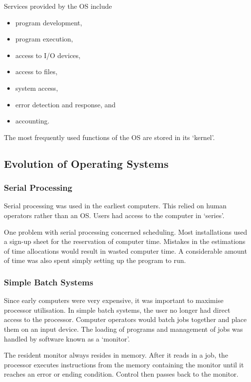 Services provided by the OS include
\begin{itemize}
  \item program development,
  \item program execution,
  \item access to I/O devices,
  \item access to files,
  \item system access,
  \item error detection and response, and
  \item accounting.
\end{itemize}
The most frequently used functions of the OS are stored in its `kernel'.

\subsection{Evolution of Operating Systems}

\subsubsection{Serial Processing}

Serial processing was used in the earliest computers.
This relied on human operators rather than an OS\@.
Users had access to the computer in `series'.

One problem with serial processing concerned scheduling.
Most installations used a sign-up sheet for the reservation of computer time.
Mistakes in the estimations of time allocations would result in wasted computer time.
A considerable amount of time was also spent simply setting up the program to run.

\subsubsection{Simple Batch Systems}

Since early computers were very expensive, it was important to maximise processor utilisation.
In simple batch systems, the user no longer had direct access to the processor.
Computer operators would batch jobs together and place them on an input device.
The loading of programs and management of jobs was handled by software known as a `monitor'.

The resident monitor always resides in memory.
After it reads in a job, the processor executes instructions from the memory containing the monitor until it reaches an error or ending condition.
Control then passes back to the monitor.

